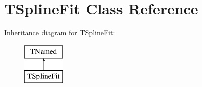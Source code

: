 \hypertarget{classTSplineFit}{\section{T\-Spline\-Fit Class Reference}
\label{classTSplineFit}
}
Inheritance diagram for T\-Spline\-Fit\-:\begin{figure}[H]
\begin{center}
\leavevmode
\includegraphics[height=2.000000cm]{classTSplineFit}
\end{center}
\end{figure}
